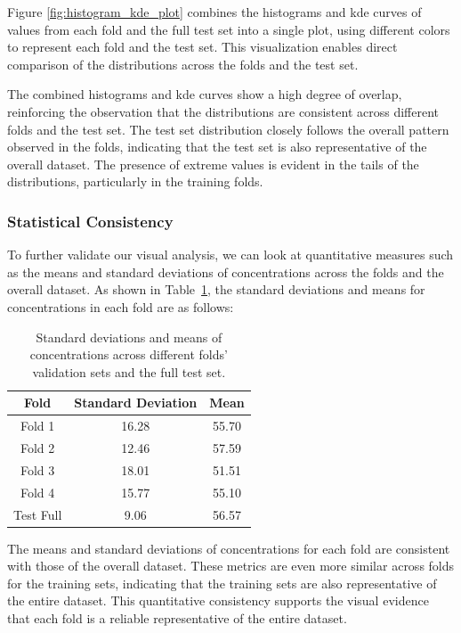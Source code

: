 Figure \ref{fig:histogram_kde_plot} combines the histograms and \gls{kde} curves of  values from each fold and the full test set into a single plot, using different colors to represent each fold and the test set.
This visualization enables direct comparison of the distributions across the folds and the test set.

The combined histograms and \gls{kde} curves show a high degree of overlap, reinforcing the observation that the distributions are consistent across different folds and the test set.
The test set distribution closely follows the overall pattern observed in the folds, indicating that the test set is also representative of the overall dataset.
The presence of extreme values is evident in the tails of the distributions, particularly in the training folds.

\subsubsection{Statistical Consistency}
To further validate our visual analysis, we can look at quantitative measures such as the means and standard deviations of  concentrations across the folds and the overall dataset.
As shown in Table~\ref{tab:siO2_std_means}, the standard deviations and means for  concentrations in each fold are as follows:

\begin{table}[h!]
    \centering
    \begin{tabular}{|c|c|c|}
        \hline
        \textbf{Fold} & \textbf{Standard Deviation} & \textbf{Mean} \\
        \hline
        Fold 1 & 16.28 & 55.70 \\
        \hline
        Fold 2 & 12.46 & 57.59 \\
        \hline
        Fold 3 & 18.01 & 51.51 \\
        \hline
        Fold 4 & 15.77 & 55.10 \\
        \hline
        Test Full & 9.06 & 56.57 \\
        \hline
    \end{tabular}
    \caption{Standard deviations and means of  concentrations across different folds' validation sets and the full test set.}
    \label{tab:siO2_std_means}
\end{table}

The means and standard deviations of  concentrations for each fold are consistent with those of the overall dataset.
These metrics are even more similar across folds for the training sets, indicating that the training sets are also representative of the entire dataset.
This quantitative consistency supports the visual evidence that each fold is a reliable representative of the entire dataset.

